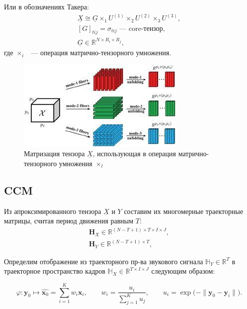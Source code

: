 \documentclass[a4paper,14pt]{article}
\newcommand{\uX}{\ensuremath{\underline{X}}}
\newcommand{\bx}{\mathbf{x}}
\newcommand{\by}{\mathbf{y}}
\newcommand{\bH}{\mathbf{H}}
\newcommand{\dH}{\mathbb{H}}
\theoremstyle{plain} %
\theoremstyle{definition} %
\theoremstyle{remark} %
\begin{document}
	Или в обозначениях Такера:
	\begin{gather*}
		\underline{X} \cong \underline{G} \times_{1} U^{(1)} \times_{2} U^{(2)} \times_{3} U^{(3)}, \\
		[G]_{t i j} = \sigma_{t i j} \text{~--- core-тензор,} \\
		\underline{G} \in \mathds{R}^{N \times R_i \times R_j},
	\end{gather*}
	где $\times_{i}$ ~--- операция матрично-тензорного умножения.

	\begin{figure}[bhtp]
		\centering
		\includegraphics[width=\linewidth]{hosvd-1.jpeg}
		\caption{Матризация тензора $\uX$, использующая в операция матрично-тензорного умножения $\times_l$}
	\end{figure}

	\subsection{CCM}
	Из апроксимированного тензора $\underline{X}$ и $Y$ составим их многомерные траекторные матрицы, считая период движения равным $T$:
	\begin{gather*}
		\bH_X \in \mathbb{R}^{(N-T+1) \times T \times I \times J}, \\
		\bH_Y \in \mathbb{R}^{(N-T+1) \times T},
	\end{gather*}

	Определим отображение из траекторного пр-ва звукового сигнала $\dH_Y \in \mathds{R}^{T}$ в траекторное пространство кадров $\dH_X \in \mathds{R}^{T \times I \times J}$ следующим образом:
	
	$$ \varphi: \by_0 \mapsto \widehat{\bx_0} = \sum\limits_{i=1}^K w_i \bx_i, \qquad 
	w_i = \dfrac{u_i}{\sum\limits_{j=1}^K u_j}, \qquad
	u_i = \exp \bigl( - \| \by_0 - \by_i \| \bigr).$$
	
\end{document}
